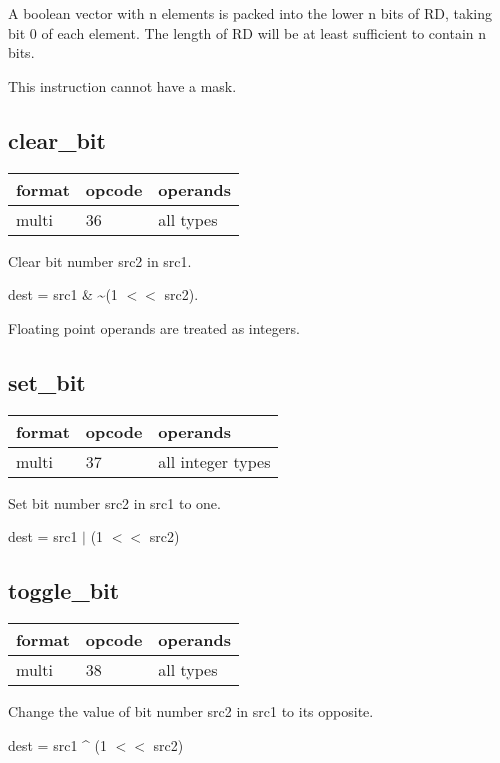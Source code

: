 \documentclass[forwardcom.tex]{subfiles}
\begin{document}
A boolean vector with n elements is packed into the lower n bits of RD, taking bit 0 of each element. 
The length of RD will be at least sufficient to contain n bits.
\vv

This instruction cannot have a mask.
\vv


\subsection{clear\_bit}
\label{table:clearBitInstruction}
\begin{tabular}{|p{12mm}|p{15mm}|p{100mm}|}
\hline
\bfseries format & \bfseries opcode & \bfseries operands \\ \hline
multi & 36 & all types \\ \hline
\end{tabular}
\vv

Clear bit number src2 in src1.
\vv

dest = src1 \& \~{}(1 $<<$ src2).

\vv
Floating point operands are treated as integers.
\vv


\subsection{set\_bit}
\label{table:setBitInstruction}
\begin{tabular}{|p{12mm}|p{15mm}|p{100mm}|}
\hline
\bfseries format & \bfseries opcode & \bfseries operands \\ \hline
multi & 37 & all integer types \\ \hline
\end{tabular}
\vv

Set bit number src2 in src1 to one.
\vv

dest = src1 $|$ (1 $<<$ src2)
\vv


\subsection{toggle\_bit}
\label{table:toggleBitInstruction}
\begin{tabular}{|p{12mm}|p{15mm}|p{100mm}|}
\hline
\bfseries format & \bfseries opcode & \bfseries operands \\ \hline
multi & 38 & all types \\ \hline
\end{tabular}
\vv

Change the value of bit number src2 in src1 to its opposite.
\vv

dest = src1 \^{} (1 $<<$ src2)
\vv
\end{document}
